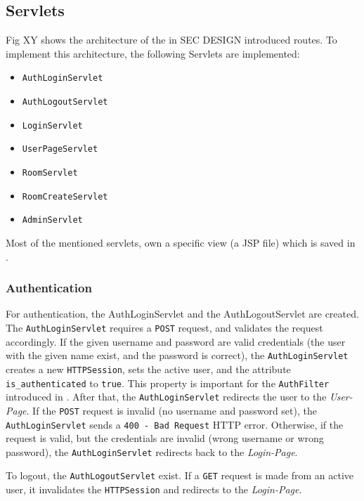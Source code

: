 %
%


\subsection{Servlets}\label{subsec:03_impl_servlets}
Fig XY shows the architecture of the in SEC DESIGN introduced routes. To implement this architecture, the following Servlets are implemented:
\begin{itemize}
\item \texttt{AuthLoginServlet}
\item \texttt{AuthLogoutServlet}
\item \texttt{LoginServlet}
\item \texttt{UserPageServlet}
\item \texttt{RoomServlet}
\item \texttt{RoomCreateServlet}
\item \texttt{AdminServlet}
\end{itemize}
Most of the mentioned servlets, own a specific view (a JSP file) which is saved in .


\subsubsection{Authentication}\label{subsubsec:03_impl_servlets_auth}
For authentication, the AuthLoginServlet and the AuthLogoutServlet are created.
The \texttt{AuthLoginServlet} requires a \texttt{POST} request, and validates the request accordingly. If the given username and password are valid credentials (the user with the given name exist, and the password is correct), the \texttt{AuthLoginServlet} creates a new \texttt{HTTPSession}, sets the active user, and the attribute \texttt{is\_authenticated} to \texttt{true}. This property is important for the \texttt{AuthFilter} introduced in . After that, the \texttt{AuthLoginServlet} redirects the user to the \textit{User-Page}.
If the \texttt{POST} request is invalid (no username and password set), the \texttt{AuthLoginServlet} sends a \texttt{400 - Bad Request} HTTP error. Otherwise, if the request is valid, but the credentials are invalid (wrong username or wrong password), the \texttt{AuthLoginServlet} redirects back to the \textit{Login-Page}.

To logout, the \texttt{AuthLogoutServlet} exist. If a \texttt{GET} request is made from an active user, it invalidates the \texttt{HTTPSession} and redirects to the \textit{Login-Page}.


